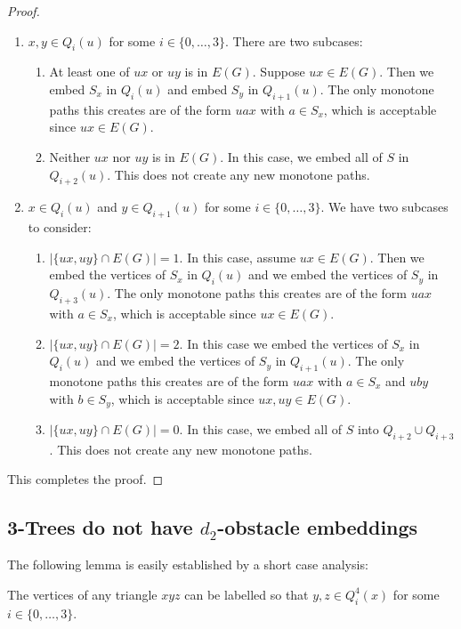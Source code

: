 \documentclass{patmorin}
\begin{document}
\begin{proof}
\begin{enumerate}
  \item $x,y\in Q_i(u)$ for some $i\in\{0,\ldots,3\}$. There are two
  subcases:
    \begin{enumerate}
      \item At least one of $ux$ or $uy$ is in $E(G)$. Suppose $ux\in E(G)$.
      Then we embed $S_x$ in $Q_i(u)$ and embed $S_y$ in $Q_{i+1}(u)$.
      The only monotone paths this creates are of the form $uax$ with
      $a\in S_x$, which is acceptable since $ux\in E(G)$.
      \item Neither $ux$ nor $uy$ is in $E(G)$. In this case, we embed all
    of $S$ in $Q_{i+2}(u)$.  This does not create any new monotone paths.
    \end{enumerate}

  \item $x\in Q_i(u)$ and $y\in Q_{i+1}(u)$ for some $i\in\{0,\ldots,3\}$.
  We have two subcases to consider:
    \begin{enumerate}
      \item $|\{ux,uy\}\cap E(G)|=1$.  In this case, assume $ux\in
      E(G)$. Then we embed the vertices of $S_x$ in $Q_i(u)$ and we
      embed the vertices of $S_y$ in $Q_{i+3}(u)$.  The only monotone
      paths this creates are of the form $uax$ with $a\in S_x$, which
      is acceptable since $ux\in E(G)$.
      \item $|\{ux,uy\}\cap E(G)|=2$.  In this case we embed the
      vertices of $S_x$ in $Q_i(u)$ and we embed the vertices of $S_y$
      in $Q_{i+1}(u)$.  The only monotone paths this creates are of the
      form $uax$ with $a\in S_x$ and $uby$ with $b\in S_y$, which is
      acceptable since $ux,uy\in E(G)$.
      \item $|\{ux,uy\}\cap E(G)|=0$.  In this case, we embed all of
      $S$ into $Q_{i+2}\cup Q_{i+3}$.  This does not create any new
      monotone paths.
    \end{enumerate}
  \end{enumerate}
This completes the proof.
\end{proof}

\subsection{3-Trees do not have $d_2$-obstacle embeddings}

The following lemma is easily established by a short case analysis:

\begin{lem}
  The vertices of any triangle $xyz$ can be labelled so that $y,z\in Q^4_i(x)$ for some $i\in\{0,\ldots,3\}$.
\end{lem}
\end{document}
